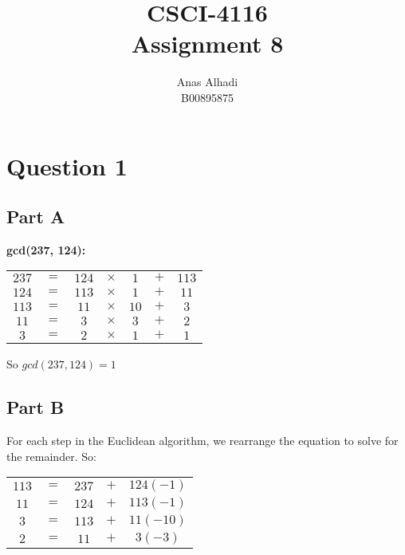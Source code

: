 \documentclass{article}
\title{\textbf{CSCI-4116\\Assignment 8}}
\author{Anas Alhadi\\B00895875}
\numberwithin{equation}{subsection}
\begin{document}
	\maketitle

	\vspace{20pt}
	
	\hrulefill

	\vspace{25pt}
	\section*{Question 1}
	\subsection*{Part A}
	
	\textbf{gcd(237, 124):}

	\begin{tabular}{c c c c c c c}
		$237$	&	$=$	&	$124$	&	$\times$	&	\underline{$1$}	&	$+$	&	\underline{$113$}	\\
		$124$	&	$=$	&	$113$	&	$\times$	&	\underline{$1$}	&	$+$	&	\underline{$11$}	\\
		$113$	&	$=$	&	$11$	&	$\times$	&	\underline{$10$}	&	$+$	&	\underline{$3$}	\\
		$11$	&	$=$	&	$3$	&	$\times$	&	\underline{$3$}	&	$+$	&	\underline{$2$}	\\
		$3$	&	$=$	&	$2$	&	$\times$	&	\underline{$1$}	&	$+$	&	\underline{$1$}	\\
	\end{tabular}

	\vspace{5pt}
	So $gcd(237, 124) = 1$

	\vspace{20pt}
	\subsection*{Part B}
	For each step in the Euclidean algorithm, we rearrange the equation to solve for the remainder. So:

	\begin{tabular}{c c c c c}
		$113$	&	$=$	&	$237$	&	$+$	&	$124(-1)$	\\
		$11$	&	$=$	&	$124$	&	$+$	&	$113(-1)$	\\
		$3$	&	$=$	&	$113$	&	$+$	&	$11(-10)$	\\
		$2$	&	$=$	&	$11$	&	$+$	&	$3(-3)$	\\
	\end{tabular}
\end{document}

